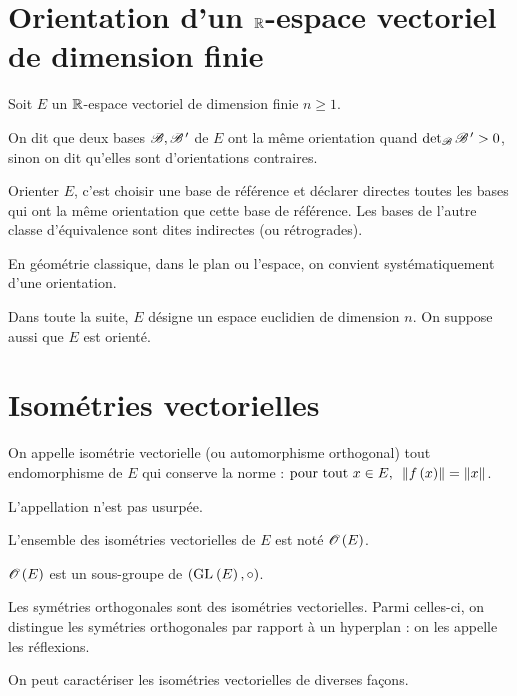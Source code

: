 \section{Orientation d'un \(\mathbb{R}\)-espace vectoriel de dimension finie}

Soit \(E\) un \(\mathbb{R}\)-espace vectoriel de dimension finie \(n\geq1\).

\begin{defi}
On dit que deux bases \(\mathscr{B},\mathscr{B}^{\,\prime}\) de \(E\) ont la même orientation quand \(\detb\fami{B}\prim>0\), sinon on dit qu'elles sont d'orientations contraires.
\end{defi}

Orienter \(E\), c'est choisir une base de référence et déclarer directes toutes les bases qui ont la même orientation que cette base de référence. Les bases de l'autre classe d'équivalence sont dites indirectes (ou rétrogrades).

En géométrie classique, dans le plan ou l'espace, on convient systématiquement d'une orientation.

Dans toute la suite, \(E\) désigne un espace euclidien de dimension \(n\). On suppose aussi que \(E\) est orienté.

\section{Isométries vectorielles}

\begin{defi}
On appelle isométrie vectorielle (ou automorphisme orthogonal) tout endomorphisme de \(E\) qui conserve la norme : \(\quantifs{\tpt x\in E}\norme{f\paren{x}}=\norme{x}\).
\end{defi}

\begin{rem}
L'appellation  n'est pas usurpée.
\end{rem}

L'ensemble des isométries vectorielles de \(E\) est noté \(\Orth{}[E]\).

\begin{prop}
\(\Orth{}[E]\) est un sous-groupe de \(\groupe{\GL{}[E]}[\rond]\).
\end{prop}

Les symétries orthogonales sont des isométries vectorielles. Parmi celles-ci, on distingue les symétries orthogonales par rapport à un hyperplan : on les appelle les réflexions.

On peut caractériser les isométries vectorielles de diverses façons.

